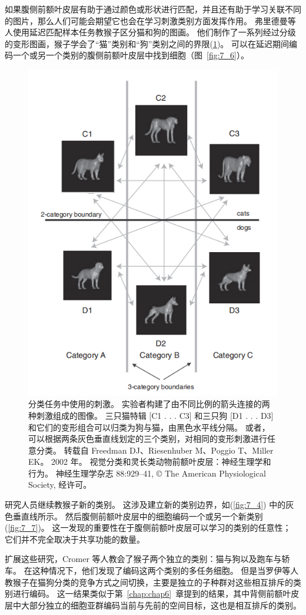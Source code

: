 如果腹侧前额叶皮层有助于通过颜色或形状进行匹配，并且还有助于学习关联不同的图片，那么人们可能会期望它也会在学习刺激类别方面发挥作用。 
弗里德曼等人\cite{freedman2001categorical,freedman2002visual}使用延迟匹配样本任务教猴子区分猫和狗的图画。 
他们制作了一系列经过分级的变形图画，猴子学会了“猫”类别和“狗”类别之间的界限(\ref{fig:7_5})。 
可以在延迟期间编码一个或另一个类别的腹侧前额叶皮层中找到细胞（图~\ref{fig:7_6}）。


\begin{figure}
	\centering
	\includegraphics[width=0.6\linewidth]{image_pfc/Fig_7_5}
	\caption{分类任务中使用的刺激。 
		实验者构建了由不同比例的箭头连接的两种刺激组成的图像。 
		三只猫特辑 [C1 . . . C3] 和三只狗 [D1 . . . D3] 和它们的变形组合可以归类为狗与猫，由黑色水平线分隔。 
		或者，可以根据两条灰色垂直线划定的三个类别，对相同的变形刺激进行任意分类。 
		转载自 Freedman DJ、Riesenhuber M、Poggio T、Miller EK。 2002 年。 
		视觉分类和灵长类动物前额叶皮层：神经生理学和行为。 
		神经生理学杂志 88:929–41, © The American Physiological Society, 经许可。\label{fig:7_5}}
\end{figure}
\par


研究人员继续教猴子新的类别。 
这涉及建立新的类别边界，如(\ref{fig:7_4}) 中的灰色垂直线所示。 
然后腹侧前额叶皮层中的细胞编码一个或另一个新类别(\ref{fig:7_7})。 
这一发现的重要性在于腹侧前额叶皮层可以学习的类别的任意性；
它们并不完全取决于共享功能的数量。
\par


扩展这些研究，Cromer 等人\cite{cromer2010representation}教会了猴子两个独立的类别：猫与狗以及跑车与轿车。
在这种情况下，他们发现了编码这两个类别的多任务细胞。 
但是当罗伊等人\cite{roy2010prefrontal}教猴子在猫狗分类的竞争方式之间切换，主要是独立的子种群对这些相互排斥的类别进行编码。 
这一结果类似于第~\ref{chap:chap6}~章提到的结果，其中背侧前额叶皮层中大部分独立的细胞亚群编码当前与先前的空间目标，这也是相互排斥的类别\cite{genovesio2006representation}。
\par


